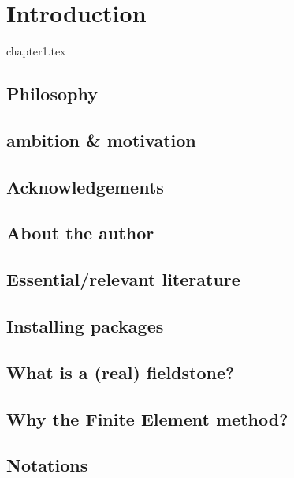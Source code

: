 \chapter{Introduction} %

\begin{flushright} {\tiny {\color{gray} chapter1.tex}} \end{flushright}

\section{Philosophy}  %
\section{ambition \& motivation}  %
\section{Acknowledgements}  %
\section{About the author}  %
\section{Essential/relevant literature}  %
\section{Installing packages}  %
\section{What is a (real) fieldstone?}  %
\section{Why the Finite Element method?}  %
\section{Notations}  %
